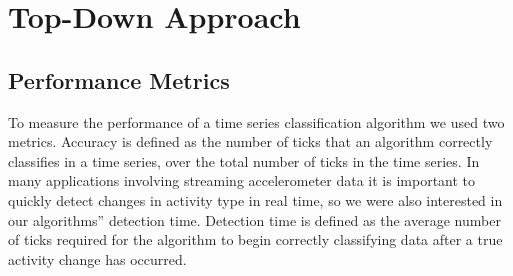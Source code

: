 \chapter{Top-Down Approach}
\section{Performance Metrics}
To measure the performance of a time series classification algorithm we used
two metrics. Accuracy is defined as the number of
ticks that an algorithm correctly classifies in a time series, over the total number of ticks
in the time series. In many applications involving streaming accelerometer data
it is important to quickly detect changes in activity type in real time, so we
were also interested in our algorithms'' detection time.
Detection time is defined as the average number of ticks
required for the algorithm to begin correctly classifying data after a
true activity change has occurred.

